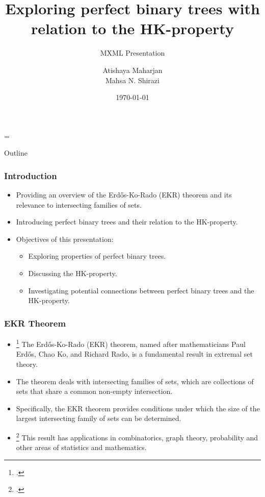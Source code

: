 \documentclass[10pt,]{beamer}
\title[HK-property | Perfect Binary Trees]{Exploring perfect binary trees with relation to the HK-property}
\subtitle{MXML Presentation} %
\author[A.M, M.N.S]{Atishaya Maharjan \\ Mahsa N. Shirazi}
\date{\today}
\theoremstyle{conjectureStyle}
\theoremstyle{notationStyle}
\begin{document}
\parskip = \baselineskip

\begin{frame} %
    \titlepage
\end{frame}

\begin{frame}{Outline}
    \tableofcontents
\end{frame}

\begin{frame}
    \frametitle{Introduction}
    \begin{itemize}
        \item Providing an overview of the Erdős-Ko-Rado (EKR) theorem and its relevance to intersecting families of sets.
        \item Introducing perfect binary trees and their relation to the HK-property.
        \item Objectives of this presentation:
              \begin{itemize}
                  \item Exploring properties of perfect binary trees.
                  \item Discussing the HK-property.
                  \item Investigating potential connections between perfect binary trees and the HK-property.
              \end{itemize}
    \end{itemize}
\end{frame}

\begin{frame}\frametitle{EKR Theorem}
    \begin{itemize}
        \item \footcite{Erds1961INTERSECTIONTF} The Erdős-Ko-Rado (EKR) theorem, named after mathematicians Paul Erdős, Chao Ko, and Richard Rado, is a fundamental result in extremal set theory.
        \item The theorem deals with intersecting families of sets, which are collections of sets that share a common non-empty intersection.
        \item  Specifically, the EKR theorem provides conditions under which the size of the largest intersecting family of sets can be determined.
        \item \footcite{MR0892525} This result has applications in combinatorics, graph theory, probability and other areas of statistics and mathematics.
    \end{itemize}
\end{frame}
\end{document}
